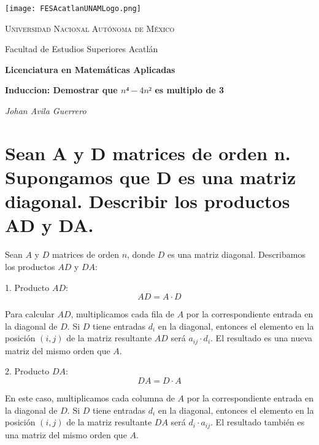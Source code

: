 \documentclass[a4paper,12pt]{article}
\begin{document}
\begin{titlepage}
    \centering
    \texttt{[image: FESAcatlanUNAMLogo.png]} %
    \vspace{1cm}
    
    {\scshape\large Universidad Nacional Autónoma de México \par}
    {\large Facultad de Estudios Superiores Acatlán \par}
    \vspace{1.5cm}
    
    {\Large\bfseries Licenciatura en Matemáticas Aplicadas \par}
    \vspace{2cm}
    
    {\Huge\bfseries  Induccion: Demostrar que \(n⁴-4n² \) es multiplo de 3
    \par}
    \vspace{2cm}
    
    {\Large\itshape Johan Avila Guerrero \par}
    \vfill
    
    
    \vfill
    
\end{titlepage}



\section{Sean A y D matrices de orden n. Supongamos que D es una matriz diagonal. Describir
los productos AD y DA.}


Sean \(A\) y \(D\) matrices de orden \(n\), donde \(D\) es una matriz diagonal. Describamos los productos \(AD\) y \(DA\):

1. Producto \(AD\):
   \[ AD = A \cdot D \]

   Para calcular \(AD\), multiplicamos cada fila de \(A\) por la correspondiente entrada en la diagonal de \(D\). Si \(D\) tiene entradas \(d_i\) en la diagonal, entonces el elemento en la posición \((i, j)\) de la matriz resultante \(AD\) será \(a_{ij} \cdot d_i\). El resultado es una nueva matriz del mismo orden que \(A\).

2. Producto \(DA\):
   \[ DA = D \cdot A \]

   En este caso, multiplicamos cada columna de \(A\) por la correspondiente entrada en la diagonal de \(D\). Si \(D\) tiene entradas \(d_i\) en la diagonal, entonces el elemento en la posición \((i, j)\) de la matriz resultante \(DA\) será \(d_i \cdot a_{ij}\). El resultado también es una matriz del mismo orden que \(A\).
\end{document}
